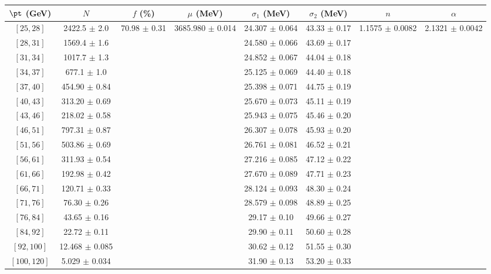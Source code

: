 \begin{tabular}{c||c|c|c|c|c|c|c}
$\pt$ (GeV) & $N$ & $f$ (\%) & $\mu$ (MeV) & $\sigma_1$ (MeV) & $\sigma_2$ (MeV) & $n$ & $\alpha$ \\
\hline
$[25, 28]$ & 2422.5 $\pm$ 2.0 & \multirow{17}{*}{70.98 $\pm$ 0.31} & \multirow{17}{*}{3685.980 $\pm$ 0.014} & 24.307 $\pm$ 0.064 & 43.33 $\pm$ 0.17 & \multirow{17}{*}{1.1575 $\pm$ 0.0082} & \multirow{17}{*}{2.1321 $\pm$ 0.0042}\\
$[28, 31]$ & 1569.4 $\pm$ 1.6 &  &  & 24.580 $\pm$ 0.066 & 43.69 $\pm$ 0.17 &  & \\
$[31, 34]$ & 1017.7 $\pm$ 1.3 &  &  & 24.852 $\pm$ 0.067 & 44.04 $\pm$ 0.18 &  & \\
$[34, 37]$ & 677.1 $\pm$ 1.0 &  &  & 25.125 $\pm$ 0.069 & 44.40 $\pm$ 0.18 &  & \\
$[37, 40]$ & 454.90 $\pm$ 0.84 &  &  & 25.398 $\pm$ 0.071 & 44.75 $\pm$ 0.19 &  & \\
$[40, 43]$ & 313.20 $\pm$ 0.69 &  &  & 25.670 $\pm$ 0.073 & 45.11 $\pm$ 0.19 &  & \\
$[43, 46]$ & 218.02 $\pm$ 0.58 &  &  & 25.943 $\pm$ 0.075 & 45.46 $\pm$ 0.20 &  & \\
$[46, 51]$ & 797.31 $\pm$ 0.87 &  &  & 26.307 $\pm$ 0.078 & 45.93 $\pm$ 0.20 &  & \\
$[51, 56]$ & 503.86 $\pm$ 0.69 &  &  & 26.761 $\pm$ 0.081 & 46.52 $\pm$ 0.21 &  & \\
$[56, 61]$ & 311.93 $\pm$ 0.54 &  &  & 27.216 $\pm$ 0.085 & 47.12 $\pm$ 0.22 &  & \\
$[61, 66]$ & 192.98 $\pm$ 0.42 &  &  & 27.670 $\pm$ 0.089 & 47.71 $\pm$ 0.23 &  & \\
$[66, 71]$ & 120.71 $\pm$ 0.33 &  &  & 28.124 $\pm$ 0.093 & 48.30 $\pm$ 0.24 &  & \\
$[71, 76]$ & 76.30 $\pm$ 0.26 &  &  & 28.579 $\pm$ 0.098 & 48.89 $\pm$ 0.25 &  & \\
$[76, 84]$ & 43.65 $\pm$ 0.16 &  &  & 29.17 $\pm$ 0.10 & 49.66 $\pm$ 0.27 &  & \\
$[84, 92]$ & 22.72 $\pm$ 0.11 &  &  & 29.90 $\pm$ 0.11 & 50.60 $\pm$ 0.28 &  & \\
$[92, 100]$ & 12.468 $\pm$ 0.085 &  &  & 30.62 $\pm$ 0.12 & 51.55 $\pm$ 0.30 &  & \\
$[100, 120]$ & 5.029 $\pm$ 0.034 &  &  & 31.90 $\pm$ 0.13 & 53.20 $\pm$ 0.33 &  & \\
\end{tabular}
